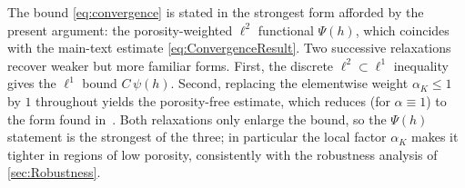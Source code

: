 \noindent The bound \eqref{eq:convergence} is stated in the strongest form afforded by the
present argument: the porosity{\hyp}weighted $\ell^2$ functional $\Psi(h)$, which coincides
with the main-text estimate \eqref{eq:ConvergenceResult}. Two successive relaxations recover
weaker but more familiar forms. First, the discrete $\ell^2\subset\ell^1$ inequality gives
the $\ell^1$ bound $C\,\psi(h)$. Second, replacing the elementwise weight $\alpha_K\le1$ by
$1$ throughout yields the porosity{\hyp}free estimate, which reduces (for $\alpha\equiv1$) to
the form found in~\cite{codina2001stabilized}. Both relaxations only enlarge the bound, so
the $\Psi(h)$ statement is the strongest of the three; in particular the local factor
$\alpha_K$ makes it tighter in regions of low porosity, consistently with the robustness analysis of
\cref{sec:Robustness}.
